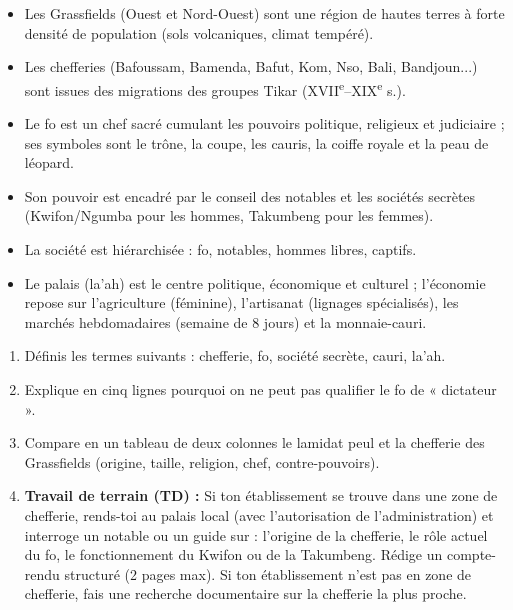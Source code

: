 \documentclass[11pt]{article}
\newcommand{\cle}[1]{{\popxbold\color{popdark}#1}}
\begin{document}
\begin{aretenir}
\begin{itemize}
\item Les Grassfields (Ouest et Nord-Ouest) sont une région de hautes terres à forte densité de population (sols volcaniques, climat tempéré).
\item Les chefferies (Bafoussam, Bamenda, Bafut, Kom, Nso, Bali, Bandjoun...) sont issues des migrations des groupes \cle{Tikar} (XVII\textsuperscript{e}--XIX\textsuperscript{e} s.).
\item Le \cle{fo} est un chef sacré cumulant les pouvoirs politique, religieux et judiciaire ; ses symboles sont le trône, la coupe, les cauris, la coiffe royale et la peau de léopard.
\item Son pouvoir est encadré par le conseil des notables et les sociétés secrètes (\cle{Kwifon}/Ngumba pour les hommes, \cle{Takumbeng} pour les femmes).
\item La société est hiérarchisée : fo, notables, hommes libres, captifs.
\item Le palais (la'ah) est le centre politique, économique et culturel ; l'économie repose sur l'agriculture (féminine), l'artisanat (lignages spécialisés), les marchés hebdomadaires (semaine de 8 jours) et la monnaie-cauri.
\end{itemize}
\end{aretenir}

\begin{exercice}
\begin{enumerate}
\item Définis les termes suivants : chefferie, fo, société secrète, cauri, la'ah.
\item Explique en cinq lignes pourquoi on ne peut pas qualifier le fo de « dictateur ».
\item Compare en un tableau de deux colonnes le lamidat peul et la chefferie des Grassfields (origine, taille, religion, chef, contre-pouvoirs).
\item \textbf{Travail de terrain (TD) :} Si ton établissement se trouve dans une zone de chefferie, rends-toi au palais local (avec l'autorisation de l'administration) et interroge un notable ou un guide sur : l'origine de la chefferie, le rôle actuel du fo, le fonctionnement du Kwifon ou de la Takumbeng. Rédige un compte-rendu structuré (2 pages max). Si ton établissement n'est pas en zone de chefferie, fais une recherche documentaire sur la chefferie la plus proche.
\end{enumerate}
\end{exercice}
\end{document}

